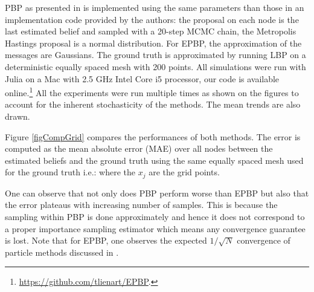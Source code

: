 PBP as presented in \citet{ihler09} is implemented using the same parameters than those in an implementation code provided by the authors: the proposal on each node is the last estimated belief and sampled with a 20-step MCMC chain, the Metropolis Hastings proposal is a normal distribution. For EPBP, the approximation of the messages are Gaussians. 
The ground truth is approximated by running LBP on a deterministic equally spaced mesh with 200 points. 
All simulations were run with Julia on a Mac with 2.5 GHz Intel Core i5 processor, our code is available online.\footnote{\url{https://github.com/tlienart/EPBP}.} 
All the experiments were run multiple times as shown on the figures to account for the inherent stochasticity of the methods. The mean trends are also drawn.

Figure \ref{figCompGrid} compares the performances of both methods. The error is computed as the mean absolute error (MAE) over all nodes between the estimated beliefs and the ground truth using the same equally spaced mesh used for the ground truth i.e.:
%
% 
where the $x_{j}$ are the grid points. 

One can observe that not only does PBP perform worse than EPBP but also that the error plateaus with increasing number of samples. 
This is because the sampling within PBP is done approximately and hence it does not correspond to a proper importance sampling estimator which means any convergence guarantee is lost. 
Note that for EPBP, one observes the expected $1/\sqrt{N}$ convergence of particle methods discussed in \citet{ihler09}.

